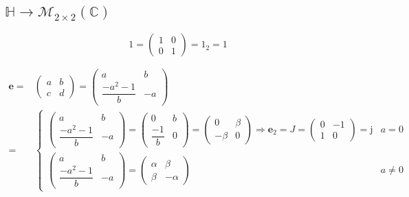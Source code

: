 \documentclass[
]{book}
\theoremstyle{definition}
\theoremstyle{definition}
\theoremstyle{definition}
\theoremstyle{definition}
\theoremstyle{remark}
\begin{document}
\subsection{\texorpdfstring{\(\mathbb{H}\rightarrow\mathcal{M}_{2\times2}\left(\mathbb{C}\right)\)}{\textbackslash mathbb\{H\}\textbackslash rightarrow\textbackslash mathcal\{M\}\_\{2\textbackslash times2\}\textbackslash left(\textbackslash mathbb\{C\}\textbackslash right)}}\label{mathbbhrightarrowmathcalm_2times2leftmathbbcright}

\[
1=\begin{pmatrix}1 & 0\\
0 & 1
\end{pmatrix}=1_{2}=1
\]

\[
\begin{aligned}
\boldsymbol{e}= & \begin{pmatrix}a & b\\
c & d
\end{pmatrix}=\begin{pmatrix}a & b\\
\dfrac{-a^{2}-1}{b} & -a
\end{pmatrix}\\
= & \begin{cases}
\begin{pmatrix}a & b\\
\dfrac{-a^{2}-1}{b} & -a
\end{pmatrix}=\begin{pmatrix}0 & b\\
\dfrac{-1}{b} & 0
\end{pmatrix}=\begin{pmatrix}0 & \beta\\
-\beta & 0
\end{pmatrix}\Rightarrow\boldsymbol{e}_{{\scriptscriptstyle 2}}=J=\begin{pmatrix}0 & -1\\
1 & 0
\end{pmatrix}=\mathrm{j} & a=0\\
\begin{pmatrix}a & b\\
\dfrac{-a^{2}-1}{b} & -a
\end{pmatrix}=\begin{pmatrix}\alpha & \beta\\
\beta & -\alpha
\end{pmatrix} & a\ne0
\end{cases}
\end{aligned}
\]
\end{document}
